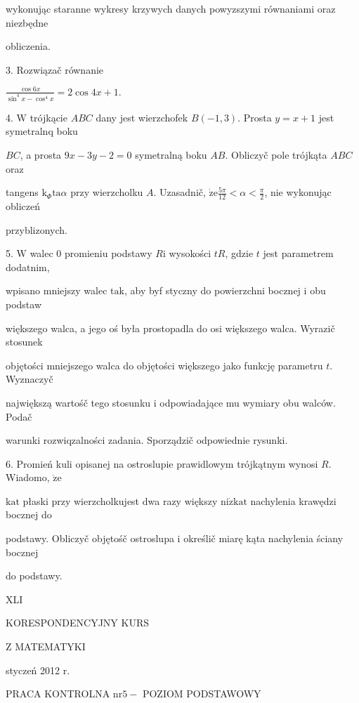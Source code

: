 \documentclass[a4paper,12pt]{article}
\begin{document}
wykonując staranne wykresy krzywych danych powyzszymi równaniami oraz niezbędne

obliczenia.

3. Rozwiązač równanie

$\displaystyle \frac{\cos 6x}{\sin^{4}x-\cos^{4}x}=2\cos 4x+1.$

4. $\mathrm{W}$ trójkącie $ABC$ dany jest wierzchofek $B(-1,3)$. Prosta $y=x+1$ jest symetralnq boku

$BC$, a prosta $9x-3y-2=0$ symetralną boku $AB$. Obliczyč pole trójkąta $ABC$ oraz

tangens $\mathrm{k}_{\Phi}\mathrm{t}\mathrm{a}\alpha$ przy wierzcholku $A$. Uzasadnič, $\displaystyle \dot{\mathrm{z}}\mathrm{e}\frac{5\pi}{12}<\alpha<\frac{\pi}{2}$, nie wykonując obliczeń

przyblizonych.

5. $\mathrm{W}$ walec $0$ promieniu podstawy $R\mathrm{i}$ wysokości $tR$, gdzie $t$ jest parametrem dodatnim,

wpisano mniejszy walec $\mathrm{t}\mathrm{a}\mathrm{k}$, aby byf styczny do powierzchni bocznej $\mathrm{i}$ obu podstaw

większego walca, a jego oś była prostopadla do osi większego walca. Wyrazič stosunek

objętości mniejszego walca do objętości większego jako funkcję parametru $t$. Wyznaczyč

największą wartośč tego stosunku $\mathrm{i}$ odpowiadające mu wymiary obu walców. Podač

warunki rozwiqzalności zadania. Sporządzič odpowiednie rysunki.

6. Promień kuli opisanej na ostroslupie prawidlowym trójkątnym wynosi $R$. Wiadomo, $\dot{\mathrm{z}}\mathrm{e}$

$\mathrm{k}\mathrm{a}\mathrm{t}$ płaski przy wierzcholkujest dwa razy większy $\mathrm{n}\mathrm{i}\dot{\mathrm{z}}\mathrm{k}\mathrm{a}\mathrm{t}$ nachylenia krawędzi bocznej do

podstawy. Obliczyč objętośč ostroslupa $\mathrm{i}$ określič miarę kąta nachylenia ściany bocznej

do podstawy.





XLI

KORESPONDENCYJNY KURS

Z MATEMATYKI

styczeń 2012 r.

PRACA KONTROLNA $\mathrm{n}\mathrm{r} 5-$ POZIOM PODSTAWOWY
\end{document}
